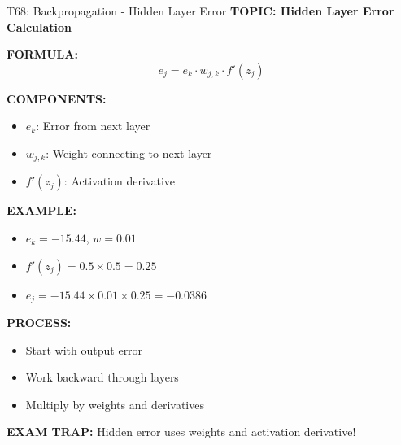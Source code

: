 \documentclass[8pt]{beamer}
\begin{document}
	\begin{frame}{T68: Backpropagation - Hidden Layer Error}
		\fontsize{6.5}{7.5}\selectfont
		\textbf{TOPIC: Hidden Layer Error Calculation}
		
		\vspace{0.1cm}
		\textbf{FORMULA:}
		\[
		e_j = e_k \cdot w_{j,k} \cdot f'(z_j)
		\]
		
		\vspace{0.1cm}
		\textbf{COMPONENTS:}
		\begin{itemize}
			\item $e_k$: Error from next layer
			\item $w_{j,k}$: Weight connecting to next layer
			\item $f'(z_j)$: Activation derivative
		\end{itemize}
		
		\vspace{0.1cm}
		\textbf{EXAMPLE:}
		\begin{itemize}
			\item $e_k = -15.44$, $w = 0.01$
			\item $f'(z_j) = 0.5 \times 0.5 = 0.25$
			\item $e_j = -15.44 \times 0.01 \times 0.25 = -0.0386$
		\end{itemize}
		
		\vspace{0.1cm}
		\textbf{PROCESS:}
		\begin{itemize}
			\item Start with output error
			\item Work backward through layers
			\item Multiply by weights and derivatives
		\end{itemize}
		
		\textcolor{myred}{\textbf{EXAM TRAP:}} Hidden error uses \textcolor{myblue}{weights and activation derivative}!
	\end{frame}
	
\end{document}
